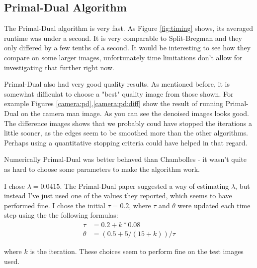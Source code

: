 \documentclass[11pt]{article}
\begin{document}
\subsection{Primal-Dual Algorithm}

The Primal-Dual algorithm is very fast.
As Figure \ref{fig:timing} shows, its averaged runtime was under a second.
It is very comparable to Split-Bregman and they only differed by a few tenths of a second.
It would be interesting to see how they compare on some larger images, unfortunately time limitations don't allow for investigating that further right now.

Primal-Dual also had very good quality results.
As mentioned before, it is somewhat difficulat to choose a "best" quality image from those shown.
For example Figures \ref{camera:pd},\ref{camera:pd:diff} show the result of running Primal-Dual on the camera man image.
As you can see the denoised images looks good.
The difference images shows that we probably coud have stopped the iterations a little sooner, as the edges seem to be smoothed more than the other algorithms.
Perhaps using a quantitative stopping criteria could have helped in that regard.

Numerically Primal-Dual was better behaved than Chambolles - it wasn't quite as hard to choose some parameters to make the algorithm work.

I chose $\lambda=0.0415$.  
The Primal-Dual paper suggested a way of estimating $\lambda$, but instead I've just used one of the values they reported, which seems to have performed fine.
I chose the initial $\tau=0.2$, where $\tau$ and $\theta$ were updated each time step using the the following formulas:
\begin{align*}
\tau &= 0.2 + k*0.08 \\
\theta &= (0.5 + 5/(15+k))/\tau
\end{align*}

where $k$ is the iteration.
These choices seem to perform fine on the test images used.
\end{document}
